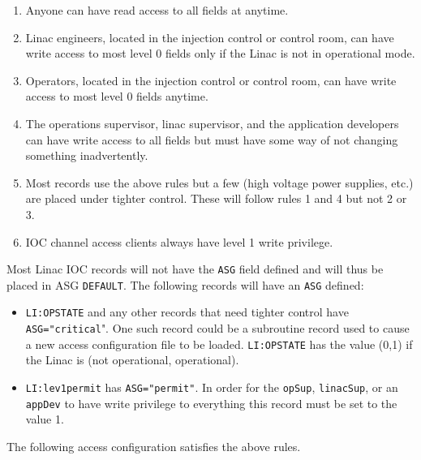 \begin{enumerate}
\item Anyone can have read access to all fields at anytime.

\item Linac engineers, located in the injection control or control room, can have write access to most level 0 fields only if 
the Linac is not in operational mode.

\item Operators, located in the injection control or control room, can have write access to most level 0 fields anytime.

\item The operations supervisor, linac supervisor, and the application developers can have write access to all fields but 
must have some way of not changing something inadvertently.

\item Most records use the above rules but a few (high voltage power supplies, etc.) are placed under tighter control. 
These will follow rules 1 and 4 but not 2 or 3.

\item IOC channel access clients always have level 1 write privilege.

\end{enumerate}

Most Linac IOC records will not have the \verb|ASG| field defined and will thus be placed in ASG \verb|DEFAULT|. The following 
records will have an \verb|ASG| defined:

\begin{itemize}
\item \verb|LI:OPSTATE| and any other records that need tighter control have \verb|ASG="critical|". One such record could be 
a subroutine record used to cause a new access configuration file to be loaded. \verb|LI:OPSTATE| has the value (0,1) 
if the Linac is (not operational, operational).

\item \verb|LI:lev1permit| has \verb|ASG="permit"|. In order for the \verb|opSup|, \verb|linacSup|, or an \verb|appDev| to have write 
privilege to everything this record must be set to the value 1.

\end{itemize}

The following access configuration satisfies the above rules.

